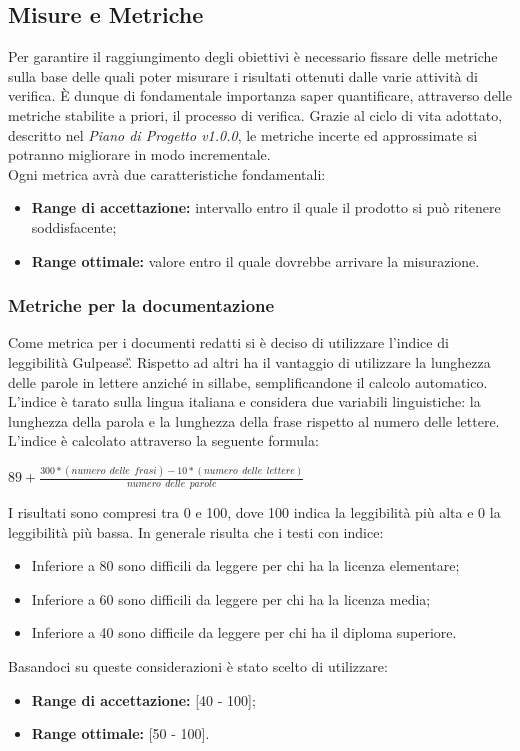 \subsection{Misure e Metriche}
Per garantire il raggiungimento degli obiettivi è necessario fissare delle metriche sulla base delle quali poter misurare i risultati ottenuti dalle varie attività di verifica. È dunque di fondamentale importanza saper quantificare, attraverso delle metriche stabilite a priori, il processo di verifica. Grazie al ciclo di vita adottato, descritto nel \textit{Piano di Progetto v1.0.0}, le metriche incerte ed approssimate si potranno migliorare in modo incrementale.\\
Ogni metrica avrà due caratteristiche fondamentali:
\begin{itemize}
	\item \textbf{Range di accettazione:} intervallo entro il quale il prodotto si può ritenere soddisfacente;
	\item \textbf{Range ottimale:} valore entro il quale dovrebbe arrivare la misurazione.
\end{itemize} 
	\subsubsection{Metriche per la documentazione}
	Come metrica per i documenti redatti si è deciso di utilizzare l'indice di leggibilità Gulpease\G. Rispetto ad altri ha il vantaggio di utilizzare la lunghezza delle parole in lettere anziché in sillabe, semplificandone il calcolo automatico. L'indice è tarato sulla lingua italiana e considera due variabili linguistiche: la lunghezza della parola e la lunghezza della frase rispetto al numero delle lettere. \\
	\noindent L'indice è calcolato attraverso la seguente formula:\\
	\begin{center}
	$89+ \frac{300*\left(numero\:\ delle\:\ frasi \right)-10*\left(numero\:\ delle\:\ lettere\right)}{numero\:\ delle\:\ parole}$
	\end{center}
	I risultati sono compresi tra 0 e 100, dove 100 indica la leggibilità più alta e 0 la leggibilità più bassa. In generale risulta che i testi con indice:
	\begin{itemize}
		\item Inferiore a 80 sono difficili da leggere per chi ha la licenza elementare;
		\item Inferiore a 60 sono difficili da leggere per chi ha la licenza media;
		\item Inferiore a 40 sono difficile da leggere per chi ha il diploma superiore.
	\end{itemize}
	Basandoci su queste considerazioni è stato scelto di utilizzare:
	\begin{itemize}
		\item \textbf{Range di accettazione:} [40 - 100];
		\item \textbf{Range ottimale:} [50 - 100].
	\end{itemize}
	
